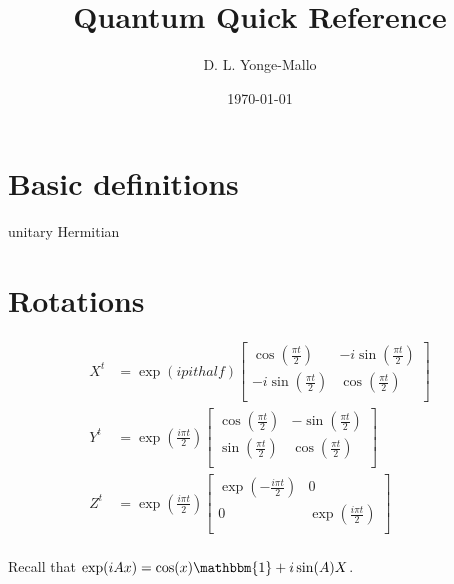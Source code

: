 \documentclass[a4paper,landscape,columns=3]{CheatSheet}
\title{Quantum Quick Reference}
\author{D. L. Yonge-Mallo}
\date{\today}
\begin{document}
\newcommand{\pithalf}{\ensuremath{\frac{\pi t}{2}}}
\newcommand{\ipithalf}{\ensuremath{\frac{i\pi t}{2}}}
\newcommand{\one}{\ensuremath{\mathbbm{1}}}

\maketitle


\section{Basic definitions}

unitary
Hermitian


\section{Rotations}

\begin{align*}
X^{t} &= \exp\left(ipithalf\right)
\begin{bmatrix}
\cos\left(\pithalf\right) & -i\sin\left(\pithalf\right) \\
-i\sin\left(\pithalf\right) & \cos\left(\pithalf\right) \\
\end{bmatrix}\\
Y^{t} &= \exp\left(\ipithalf\right)
\begin{bmatrix}
\cos\left(\pithalf\right) & -\sin\left(\pithalf\right) \\
\sin\left(\pithalf\right) & \cos\left(\pithalf\right) \\
\end{bmatrix}\\
Z^{t} &= \exp\left(\ipithalf\right)
\begin{bmatrix}
\exp\left(-\ipithalf\right) & 0 \\
0 & \exp\left(\ipithalf\right) \\
\end{bmatrix}\\
\end{align*}

Recall that \(\exp(iAx) = \cos(x)\one + i\sin(A)X\).


\end{document}
